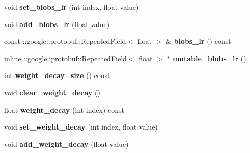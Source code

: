 \begin{DoxyCompactItemize}
\mbox{\label{classcaffe_1_1_v0_layer_parameter_a6808c566510961daddc12dfac8819ee0}} 
void {\bfseries set\+\_\+blobs\+\_\+lr} (int index, float value)
\item 
\mbox{\label{classcaffe_1_1_v0_layer_parameter_aeca0355623adb3a6d7432f121f155b76}} 
void {\bfseries add\+\_\+blobs\+\_\+lr} (float value)
\item 
\mbox{\label{classcaffe_1_1_v0_layer_parameter_ac9c5e5daee235af52173fb2785ae4597}} 
const \+::google\+::protobuf\+::\+Repeated\+Field$<$ float $>$ \& {\bfseries blobs\+\_\+lr} () const
\item 
\mbox{\label{classcaffe_1_1_v0_layer_parameter_aa981c0018346ea353d03dde54300e1b1}} 
inline \+::google\+::protobuf\+::\+Repeated\+Field$<$ float $>$ $\ast$ {\bfseries mutable\+\_\+blobs\+\_\+lr} ()
\item 
\mbox{\label{classcaffe_1_1_v0_layer_parameter_a07bfc3bc513810fa6741308fa62bffad}} 
int {\bfseries weight\+\_\+decay\+\_\+size} () const
\item 
\mbox{\label{classcaffe_1_1_v0_layer_parameter_a2a57929236bf1d130a89d3bb711bea0d}} 
void {\bfseries clear\+\_\+weight\+\_\+decay} ()
\item 
\mbox{\label{classcaffe_1_1_v0_layer_parameter_ace05abd10a0c13883e8373a8e99a2202}} 
float {\bfseries weight\+\_\+decay} (int index) const
\item 
\mbox{\label{classcaffe_1_1_v0_layer_parameter_a85c6bbbb973441dc5f0d34c8c394651c}} 
void {\bfseries set\+\_\+weight\+\_\+decay} (int index, float value)
\item 
\mbox{\label{classcaffe_1_1_v0_layer_parameter_aaec46c641f69421ba64830912aeb2f1f}} 
void {\bfseries add\+\_\+weight\+\_\+decay} (float value)
\item 
\mbox{\label{classcaffe_1_1_v0_layer_parameter_a546c4abebbc4df79e46ff2f0c3e6b375}} 

\end{DoxyCompactItemize}
